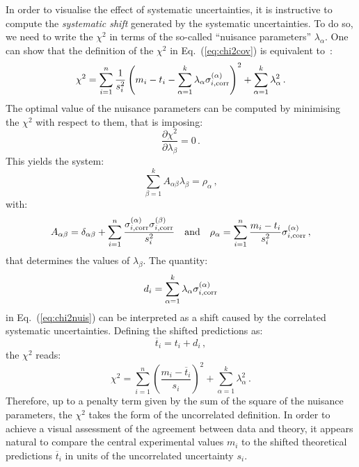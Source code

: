 \documentclass[10pt,a4paper]{article}
\begin{document}
In order to visualise the effect of systematic uncertainties, it is
instructive to compute the \textit{systematic shift} generated by the
systematic uncertainties. To do so, we need to write the $\chi^2$ in
terms of the so-called ``nuisance parameters'' $\lambda_\alpha$. One
can show that the definition of the $\chi^2$ in Eq.~(\ref{eq:chi2cov})
is equivalent to~\cite{Ball:2012wy}:
\begin{equation}\label{eq:chi2nuis}
\chi^2 = \sum_{i=1}^n\frac{1}{s_i^2}\left(m_i -t_i
  -\sum_{\alpha=1}^k\lambda_\alpha \sigma_{i,\rm corr}^{(\alpha)} \right)^2 + \sum_{\alpha=1}^k\lambda_\alpha^2\,.
\end{equation}
The optimal value of the nuisance parameters can be computed by
minimising the $\chi^2$ with respect to them, that is imposing:
\begin{equation}
\frac{\partial \chi^2}{\partial \lambda_\beta} = 0\,.
\end{equation}
This yields the system:
\begin{equation}\label{eq:nuissys}
  \sum_{\beta=1}^kA_{\alpha\beta}\lambda_\beta =\rho_\alpha\,,
\end{equation}
with:
\begin{equation}\label{eq:sysing}
A_{\alpha\beta}= \delta_{\alpha\beta}+\sum_{i=1}^n\frac{\sigma_{i,\rm corr}^{(\alpha)}\sigma_{i,\rm corr}^{(\beta)}}{s_i^2}\quad\mbox{and}\quad \rho_\alpha=\sum_{i=1}^n\frac{m_i-t_i}{s_i^2}\sigma_{i,\rm corr}^{(\alpha)}\,,
\end{equation}
that determines the values of $\lambda_\beta$. The quantity:
\begin{equation}
d_i =\sum_{\alpha=1}^k\lambda_\alpha \sigma_{i,\rm corr}^{(\alpha)}
\end{equation}
in Eq.~(\ref{eq:chi2nuis}) can be interpreted as a shift caused by the
correlated systematic uncertainties. Defining the shifted predictions
as:
\begin{equation}
\overline{t}_i =t_i+d_i\,,
\end{equation}
the $\chi^2$ reads:
\begin{equation}\label{eq:chi2nuisshift}
  \chi^2 = \sum_{i=1}^n\left(\frac{m_i -\overline{t}_i}{s_i}\right)^2 + \sum_{\alpha=1}^k\lambda_\alpha^2\,.
\end{equation}
Therefore, up to a penalty term given by the sum of the square of the
nuisance parameters, the $\chi^2$ takes the form of the uncorrelated
definition. In order to achieve a visual assessment of the agreement
between data and theory, it appears natural to compare the central
experimental values $m_i$ to the shifted theoretical predictions
$\overline{t}_i$ in units of the uncorrelated uncertainty $s_i$.
\end{document}
